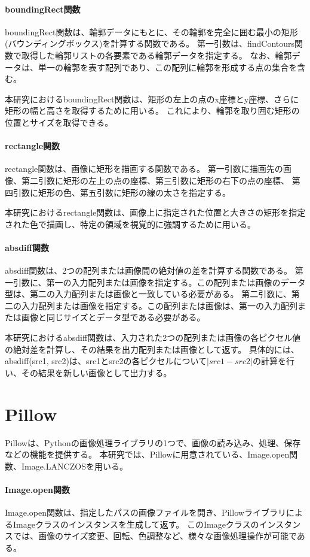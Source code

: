 \paragraph{boundingRect関数}
boundingRect関数は、輪郭データにもとに、その輪郭を完全に囲む最小の矩形(バウンディングボックス)を計算する関数である。
第一引数は、findContours関数で取得した輪郭リストの各要素である輪郭データを指定する。
なお、輪郭データは、単一の輪郭を表す配列であり、この配列に輪郭を形成する点の集合を含む。
\par
本研究におけるboundingRect関数は、矩形の左上の点のx座標とy座標、さらに矩形の幅と高さを取得するために用いる。
これにより、輪郭を取り囲む矩形の位置とサイズを取得できる。
\paragraph{rectangle関数}
rectangle関数は、画像に矩形を描画する関数である。
第一引数に描画先の画像、第二引数に矩形の左上の点の座標、第三引数に矩形の右下の点の座標、
第四引数に矩形の色、第五引数に矩形の線の太さを指定する。
\par
本研究におけるrectangle関数は、画像上に指定された位置と大きさの矩形を指定された色で描画し、特定の領域を視覚的に強調するために用いる。
\paragraph{absdiff関数}
absdiff関数は、2つの配列または画像間の絶対値の差を計算する関数である。
第一引数に、第一の入力配列または画像を指定する。この配列または画像のデータ型は、第二の入力配列または画像と一致している必要がある。
第二引数に、第二の入力配列または画像を指定する。この配列または画像は、第一の入力配列または画像と同じサイズとデータ型である必要がある。
\par
本研究におけるabsdiff関数は、入力された2つの配列または画像の各ピクセル値の絶対差を計算し、その結果を出力配列または画像として返す。
具体的には、absdiff(src1, src2)は、src1とsrc2の各ピクセルについて$|src1 - src2|$の計算を行い、その結果を新しい画像として出力する。

\section{Pillow}\label{sec:pillow}
Pillow\cite{Pillow}は、Python\cite{Python}の画像処理ライブラリの1つで、画像の読み込み、処理、保存などの機能を提供する。
本研究では、Pillowに用意されている、Image.open関数、Image.LANCZOSを用いる。
\paragraph{Image.open関数}
Image.open関数は、指定したパスの画像ファイルを開き、PillowライブラリによるImageクラスのインスタンスを生成して返す。
このImageクラスのインスタンスでは、画像のサイズ変更、回転、色調整など、様々な画像処理操作が可能である。
